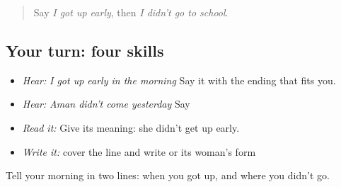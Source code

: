 \label{lesson:PA-C218-payoff}



\begin{quote}
Say \emph{I got up early}, then \emph{I didn't go to school}.
\end{quote}

\subsection*{Your turn: four skills}
\begin{itemize}
\raggedright
  \item \emph{Hear:} \emph{I got up early in the morning} Say it with the ending that fits you.
  \item \emph{Hear:} \emph{Aman didn't come yesterday} Say \textbf{   }
  \item \emph{Read it:} \textbf{   } Give its meaning: she didn't get up early.
  \item \emph{Write it:} cover the line and write \textbf{  } or its woman's form
\end{itemize}

\begin{tcolorbox}[breakable,colback=teal!4,colframe=teal!35!black,title={Before you move on}]
Tell your morning in two lines: when you got up, and where you didn't go.
\end{tcolorbox}
